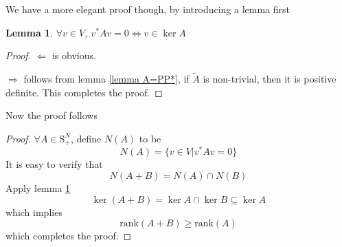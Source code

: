 \documentclass[12pt]{article}
\newtheorem{lemma}{Lemma}
\begin{document}
We have a more elegant proof though, by introducing a lemma first
\begin{lemma}\label{lemma kerA}
	$\forall v\in V$, $v^*Av=0\Leftrightarrow v\in\ker A$
\end{lemma}
\begin{proof}
	$\Leftarrow$ is obvious. 
	
	$\Rightarrow$
	follows from lemma \ref{lemma A=PP*}, if $\tilde{A}$ is non-trivial, then it is positive definite. This completes the proof.
\end{proof}
Now the proof follows
\begin{proof}
	$\forall A\in \mbox{S}_+^N$, define $N(A)$ to be
	$$N(A)=\{v\in V|v^*Av=0 \}$$
	It is easy to verify that
	$$N(A+B)=N(A)\cap N(B)$$
	Apply lemma \ref{lemma kerA}
	$$\ker(A+B)=\ker A\cap\ker B\subseteq\ker A$$
	which implies
	$$\mbox{rank}(A+B)\geq\mbox{rank}(A)$$
	which completes the proof.
\end{proof}
\end{document}
